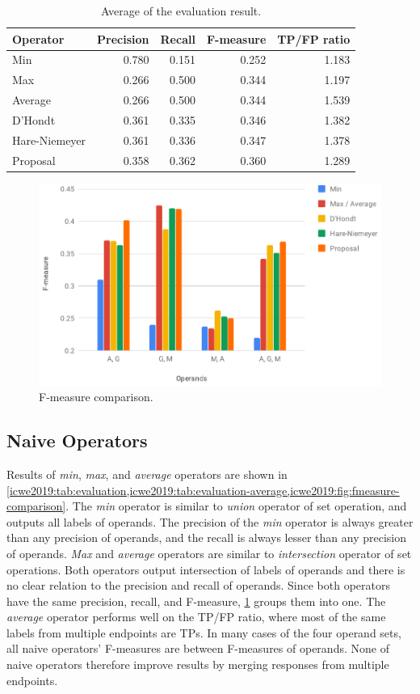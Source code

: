 \begin{table}
\caption[Average of evaluation result of the facade]{Average of the evaluation result.}\label{icwe2019:tab:evaluation-average}
\centering
\begin{tabular}{l|rrr|r}
\toprule
\textbf{Operator} & \textbf{Precision} & \textbf{Recall} & \textbf{F-measure} & \textbf{TP/FP ratio} \\
\midrule
Min & 0.780 & 0.151 & 0.252 & 1.183 \\
Max & 0.266 & 0.500 & 0.344 & 1.197 \\
Average & 0.266 & 0.500 & 0.344 & 1.539 \\
D'Hondt & 0.361 & 0.335 & 0.346 & 1.382 \\
Hare-Niemeyer & 0.361 & 0.336 & 0.347 & 1.378 \\
Proposal & 0.358 & 0.362 & 0.360 & 1.289 \\
\bottomrule
\end{tabular}
\end{table}

\begin{figure}
\centering\includegraphics[width=.76\columnwidth]{fmeasures}
\caption[F-measure comparison]{F-measure comparison.}\label{icwe2019:fig:fmeasure-comparison}
\end{figure}

\subsection{Naive Operators}

Results of \textit{min}, \textit{max}, and \textit{average} operators are shown in \cref{icwe2019:tab:evaluation,icwe2019:tab:evaluation-average,icwe2019:fig:fmeasure-comparison}.
The \textit{min} operator is similar to \textit{union} operator of set operation, and outputs all labels of operands.
The precision of the \textit{min} operator is always greater than any precision of operands, and the recall is always lesser than any precision of operands.
\textit{Max} and \textit{average} operators are similar to \textit{intersection} operator of set operations.
Both operators output intersection of labels of operands and there is no clear relation to the precision and recall of operands.
Since both operators have the same precision, recall, and F-measure, \cref{icwe2019:fig:fmeasure-comparison} groups them into one.
The \textit{average} operator performs well on the TP/FP ratio, where most of the same labels from multiple endpoints are TPs.
In many cases of the four operand sets, all naive operators' F-measures are between F-measures of operands.
None of naive operators therefore improve results by merging responses from multiple endpoints.

